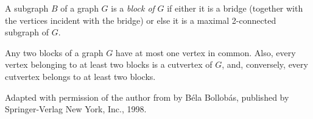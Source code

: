 \documentclass[12pt]{article}
\begin{document}
A subgraph $B$ of a graph $G$ is a \emph{block of} $G$ if either it is a bridge (together with the vertices incident with the bridge) or else it is a maximal 2-connected subgraph of $G$.

Any two blocks of a graph $G$ have at most one vertex in common. Also, every vertex belonging to at least two blocks is a cutvertex of $G$, and, conversely, every cutvertex belongs to at least two blocks.


\footnotesize{Adapted with permission of the author from \emph{} by B\'{e}la Bollob\'{a}s, published by Springer-Verlag New York, Inc., 1998.}
\end{document}
